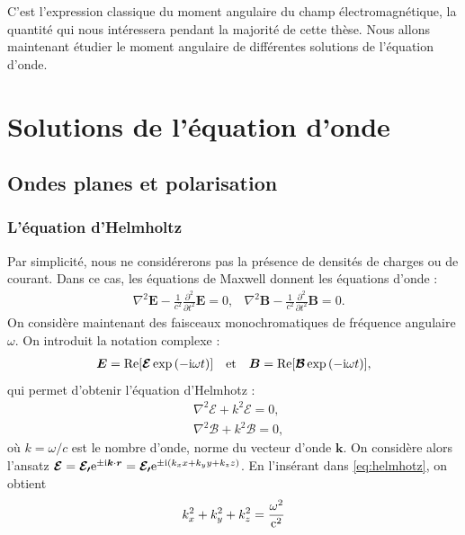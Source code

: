 C'est l'expression classique du moment angulaire du champ électromagnétique, la quantité qui nous intéressera pendant la majorité de cette thèse. Nous allons maintenant étudier le moment angulaire de différentes solutions de l'équation d'onde.

\section{Solutions de l'équation d'onde}
\subsection{Ondes planes et polarisation}
\subsubsection{L'équation d'Helmholtz}
Par simplicité, nous ne considérerons pas la présence de densités de charges ou de courant. Dans ce cas, les équations de Maxwell donnent les équations d'onde :
\begin{align*}
&\nabla^2\bm{E}-\frac{1}{c^2}\frac{\partial^2}{\partial t^2}\bm{E}=0,
&\nabla^2\bm{B}-\frac{1}{c^2}\frac{\partial^2}{\partial t^2}\bm{B}=0.
\end{align*}
On considère maintenant des faisceaux monochromatiques de fréquence angulaire $\omega$. On introduit la notation complexe :
\begin{equation*}
\begin{split}
\bm{E}=\text{Re}[\bm{\mathcal{E}}\exp{(-\mathrm{i}\omega t)}]
\end{split}
\quad\text{et}\quad
\begin{split}
\bm{B}=\text{Re}[\bm{\mathcal{B}}\exp{(-\mathrm{i}\omega t)}],
\end{split}
\end{equation*}
qui permet d'obtenir l'équation d'Helmhotz :
\begin{align}
&\nabla^2\bm{\mathcal{E}}+k^2\bm{\mathcal{E}}=0,\nonumber\\
&\nabla^2\bm{\mathcal{B}}+k^2\bm{\mathcal{B}}=0,
\label{eq:helmhotz}
\end{align}
où $k=\omega/c$ est le nombre d'onde, norme du vecteur d'onde $\bm{k}$. On considère alors l'ansatz $\bm{\mathcal{E}}=\bm{\mathcal{E_0}}\mathrm{e}^{\pm\mathrm{i}\bm{k}\cdot\bm{r}} = \bm{\mathcal{E_0}}\mathrm{e}^{\pm\mathrm{i}(k_x x + k_y y + k_z z)}$. En l'insérant dans \ref{eq:helmhotz}, on obtient 
\begin{equation*}
k_x^2+k_y^2+k_z^2=\frac{\omega^2}{\mathrm{c}^2}
\end{equation*}
